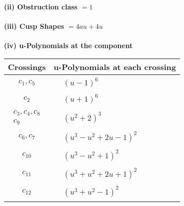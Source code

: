 \documentclass[1p]{elsarticle_modified}
\theoremstyle{definition}
\begin{document}
\flushleft \textbf{(ii) Obstruction class $= 1$}\\~\\
\flushleft \textbf{(iii) Cusp Shapes $= 4 a u+4 u$}\\~\\
\newpage\renewcommand{\arraystretch}{1}
\flushleft \textbf{(iv) u-Polynomials at the component}\newline \\
\begin{tabular}{m{50pt}|m{274pt}}
Crossings & \hspace{64pt}u-Polynomials at each crossing \\
\hline $$\begin{aligned}c_{1},c_{5}\end{aligned}$$&$\begin{aligned}
&(u-1)^6
\end{aligned}$\\
\hline $$\begin{aligned}c_{2}\end{aligned}$$&$\begin{aligned}
&(u+1)^6
\end{aligned}$\\
\hline $$\begin{aligned}c_{3},c_{4},c_{8}\\c_{9}\end{aligned}$$&$\begin{aligned}
&(u^2+2)^3
\end{aligned}$\\
\hline $$\begin{aligned}c_{6},c_{7}\end{aligned}$$&$\begin{aligned}
&(u^3- u^2+2 u-1)^2
\end{aligned}$\\
\hline $$\begin{aligned}c_{10}\end{aligned}$$&$\begin{aligned}
&(u^3- u^2+1)^2
\end{aligned}$\\
\hline $$\begin{aligned}c_{11}\end{aligned}$$&$\begin{aligned}
&(u^3+u^2+2 u+1)^2
\end{aligned}$\\
\hline $$\begin{aligned}c_{12}\end{aligned}$$&$\begin{aligned}
&(u^3+u^2-1)^2
\end{aligned}$\\
\hline
\end{tabular}\\~\\
\end{document}
